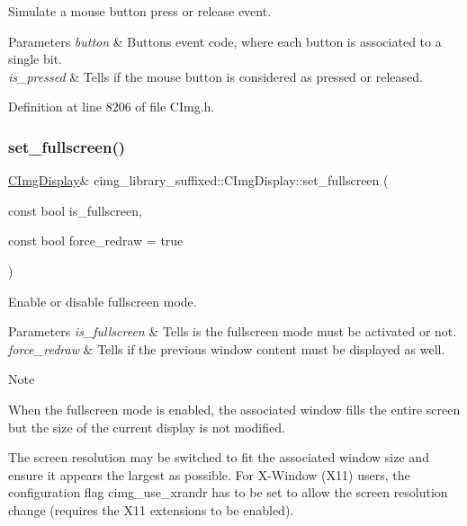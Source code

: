 Simulate a mouse button press or release event. 


\begin{DoxyParams}{Parameters}
{\em button} & Buttons event code, where each button is associated to a single bit. \\
\hline
{\em is\+\_\+pressed} & Tells if the mouse button is considered as pressed or released. \\
\hline
\end{DoxyParams}


Definition at line 8206 of file C\+Img.\+h.

\mbox{\label{structcimg__library__suffixed_1_1CImgDisplay_ad36ec47ee020691298c13340ca35da39}} 
\subsubsection{\texorpdfstring{set\+\_\+fullscreen()}{set\_fullscreen()}}
{\footnotesize\ttfamily \hyperlink{structcimg__library__suffixed_1_1CImgDisplay}{C\+Img\+Display}\& cimg\+\_\+library\+\_\+suffixed\+::\+C\+Img\+Display\+::set\+\_\+fullscreen (\begin{DoxyParamCaption}\item[{const bool}]{is\+\_\+fullscreen,  }\item[{const bool}]{force\+\_\+redraw = {\ttfamily true} }\end{DoxyParamCaption})\hspace{0.3cm}{\ttfamily [inline]}}



Enable or disable fullscreen mode. 


\begin{DoxyParams}{Parameters}
{\em is\+\_\+fullscreen} & Tells is the fullscreen mode must be activated or not. \\
\hline
{\em force\+\_\+redraw} & Tells if the previous window content must be displayed as well. \\
\hline
\end{DoxyParams}
\begin{DoxyNote}{Note}

\begin{DoxyItemize}
\item When the fullscreen mode is enabled, the associated window fills the entire screen but the size of the current display is not modified.
\item The screen resolution may be switched to fit the associated window size and ensure it appears the largest as possible. For X-\/\+Window (X11) users, the configuration flag {\ttfamily cimg\+\_\+use\+\_\+xrandr} has to be set to allow the screen resolution change (requires the X11 extensions to be enabled). 
\end{DoxyItemize}
\end{DoxyNote}


